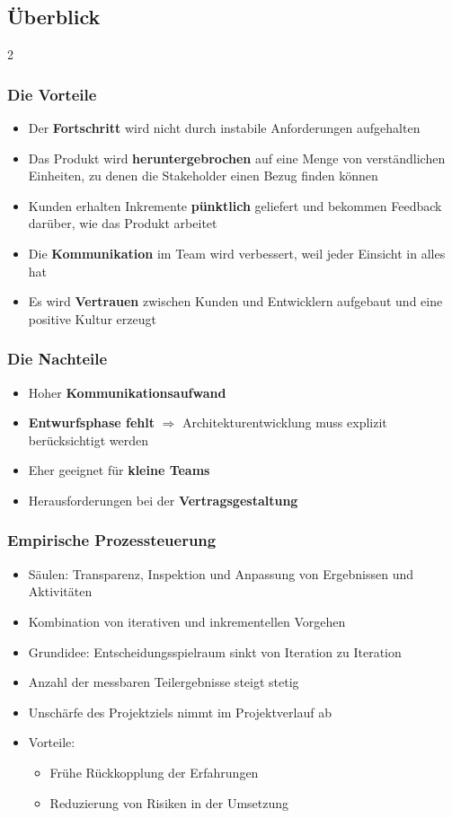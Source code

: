 \documentclass[main.tex]{subfiles}
\begin{document}
\subsection{Überblick}
\begin{multicols}{2}
\subsubsection*{Die Vorteile}
\begin{itemize}
    \item Der \textbf{Fortschritt} wird nicht durch instabile Anforderungen aufgehalten
    \item Das Produkt wird \textbf{heruntergebrochen} auf eine Menge von verständlichen Einheiten, zu denen die Stakeholder einen Bezug finden können
    \item Kunden erhalten Inkremente \textbf{pünktlich} geliefert und bekommen Feedback darüber, wie das Produkt arbeitet
    \item Die \textbf{Kommunikation} im Team wird verbessert, weil jeder Einsicht in alles hat
    \item Es wird \textbf{Vertrauen} zwischen Kunden und Entwicklern aufgebaut und eine positive Kultur erzeugt
\end{itemize}
\columnbreak
\subsubsection*{Die Nachteile}
\begin{itemize}
    \item Hoher \textbf{Kommunikationsaufwand}
    \item \textbf{Entwurfsphase fehlt} $\Rightarrow$ Architekturentwicklung muss explizit berücksichtigt werden
    \item Eher geeignet für \textbf{kleine Teams}
    \item Herausforderungen bei der \textbf{Vertragsgestaltung}
\end{itemize}
\end{multicols}

\subsubsection*{Empirische Prozessteuerung}
\begin{itemize}
    \item Säulen: Transparenz, Inspektion und Anpassung von Ergebnissen und Aktivitäten
    \item Kombination von iterativen und inkrementellen Vorgehen
    \item Grundidee: Entscheidungsspielraum sinkt von Iteration zu Iteration
    \item Anzahl der messbaren Teilergebnisse steigt stetig
    \item Unschärfe des Projektziels nimmt im Projektverlauf ab
    \item Vorteile:
    \begin{itemize}
        \item Frühe Rückkopplung der Erfahrungen
        \item Reduzierung von Risiken in der Umsetzung
    \end{itemize}
\end{itemize}
\end{document}

